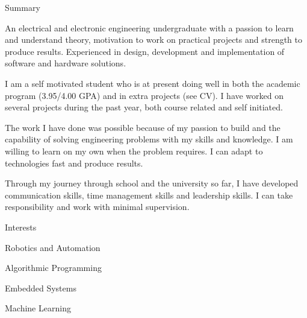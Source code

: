 \documentclass{resume} %
\begin{document}

\begin{rSection}{Summary}
\begin{rSubsection}{}{}{}{}
An electrical and electronic engineering undergraduate with a passion to learn and understand theory, motivation to work on practical projects and strength to produce results. Experienced in design, development and implementation of software and hardware solutions. 

I am a self motivated student who is at present doing well in both the academic program (3.95/4.00 GPA) and in extra projects (see CV). I have worked on several projects during the past year, both course related and self initiated.

The work I have done was possible because of my passion to build and the capability of solving engineering problems with my skills and knowledge. I am willing to learn on my own when the problem requires. I can adapt to technologies fast and produce results.

Through my journey through school and the university so far, I have developed communication skills, time management skills and leadership skills. I can take responsibility and work with minimal supervision.

\end{rSubsection}
\end{rSection}




\begin{rSection}{Interests}
\begin{rSubsection}{}{}{}{}
\item Robotics and Automation
\item Algorithmic Programming 
\item Embedded Systems
\item Machine Learning
\end{rSubsection}


\end{rSection}
\end{document}
